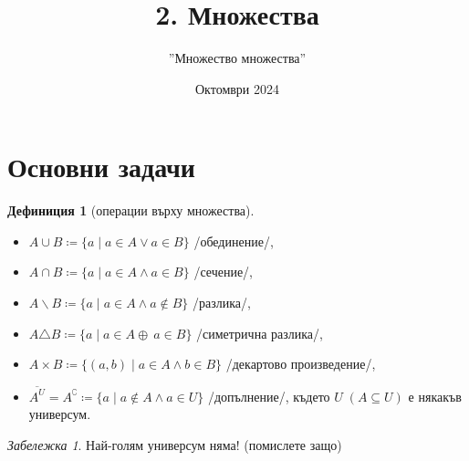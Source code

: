 \documentclass[10pt, a4paper]{article}
\title{2. Множества}
\author{''Множество множества''}
\date{Октомври 2024}
\theoremstyle{definition}
\newtheorem{definition}{Дефиниция}[section]
\theoremstyle{remark}
\newtheorem*{remark}{Забележка}
\begin{document}
\maketitle
\section{Основни задачи}


\newcommand{\strikeRow}[1]{
    \multicolumn{3}{|c|}{
        \tikz[baseline]{
            \node[inner sep=0pt, outer sep=0pt] (A) {#1};
            \draw[thick] (A.south west) -- (A.north east);
        }
    }
}



\begin{definition}[операции върху множества]\hfill
    \begin{itemize}
        \item \(A\cup B\coloneq\{a\;|\;a\in A\vee a\in B\}\) /обединение/,  
        \item \(A\cap B\coloneq\{a\;|\;a\in A\wedge a\in B\}\) /сечение/,  
        \item \(A\backslash B\coloneq\{a\;|\;a\in A \wedge a\notin B\}\) /разлика/,
        \item \(A\triangle B\coloneq\{a\;|\;a\in A\oplus\ a\in B\}\) /симетрична разлика/,
        \item \(A\times B\coloneq\{(a,b)\;|\;a\in A\wedge b\in B\}\) /декартово произведение/,  
        \item \(\overline{A^U}=A^{\complement}\coloneq\{a\;|\;a\notin A \wedge a\in U\}\) /допълнение/, където \(U\;(A\subseteq U)\) е някакъв универсум.
    \end{itemize}
    \begin{remark}
        Най-голям универсум няма! (помислете защо)
    \end{remark}
\end{definition}
\end{document}
